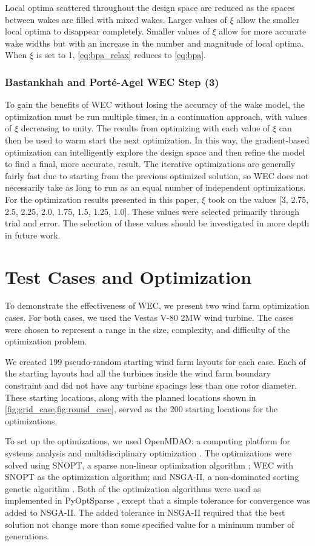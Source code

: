 \documentclass[a4paper]{jpconf}
\begin{document}
Local optima scattered throughout the design space are reduced as the spaces between wakes are filled with mixed wakes. Larger values of $\xi$ allow the smaller local optima to disappear completely. Smaller values of $\xi$ allow for more accurate wake widths but with an increase in the number and magnitude of local optima. When $\xi$ is set to 1, \cref{eq:bpa_relax} reduces to \cref{eq:bpa}.

\subsubsection{Bastankhah and Port\'e-Agel WEC Step (3)}
To gain the benefits of WEC without losing the accuracy of the wake model, the optimization must be run multiple times, in a continuation approach, with values of $\xi$ decreasing to unity. The results from optimizing with each value of $\xi$ can then be used to warm start the next optimization. In this way, the gradient-based optimization can intelligently explore the design space and then refine the model to find a final, more accurate, result. The iterative optimizations are generally fairly fast due to starting from the previous optimized solution, so WEC does not necessarily take as long to run as an equal number of independent optimizations. For the optimization results presented in this paper, $\xi$ took on the values [3, 2.75, 2.5, 2.25, 2.0, 1.75, 1.5, 1.25, 1.0]. These values were selected primarily through trial and error. The selection of these values should be investigated in more depth in future work.

\section{Test Cases and Optimization}
To demonstrate the effectiveness of WEC, we present two wind farm optimization cases. For both cases, we used the Vestas V-80 2MW wind turbine. The cases were chosen to represent a range in the size, complexity, and difficulty of the optimization problem.

We created 199 pseudo-random starting wind farm layouts for each case. Each of the starting layouts had all the turbines inside the wind farm boundary constraint and did not have any turbine spacings less than one rotor diameter. These starting locations, along with the planned locations shown in \cref{fig:grid_case,fig:round_case}, served as the 200 starting locations for the optimizations.

To set up the optimizations, we used OpenMDAO: a computing platform for systems analysis and multidisciplinary optimization \cite{gray2010_OpenMDAO}. The optimizations were solved using SNOPT, a sparse non-linear optimization algorithm \cite{gill2005}; WEC with SNOPT as the optimization algorithm; 
and NSGA-II, a non-dominated sorting genetic algorithm \cite{deb2002_nsga2}. Both of the optimization algorithms were used as implemented in PyOptSparse \cite{ruben2012_pyopt}, except that a simple tolerance for convergence was added to NSGA-II. The added tolerance in NSGA-II required that the best solution not change more than some specified value for a minimum number of generations. 
\end{document}

